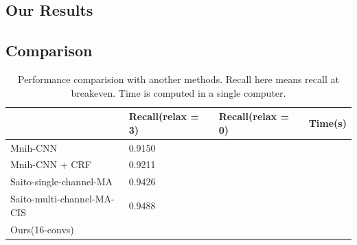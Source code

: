\documentclass[runningheads]{llncs}
\begin{document}
\subsection{Our Results}
   
   
\subsection{Comparison}   
   
    \begin{table} \label{tab:PerformanceComparision}
    \centering
	\caption{Performance comparision with another methods. Recall here  means recall at breakeven. Time is computed in a single computer.}
	\begin{tabular}{L{4.1cm}C{2.6cm}C{2.6cm}C{2.2cm}}    %
	\toprule
	& Recall(relax = 3) & Recall(relax = 0)& Time(s)\\
	\midrule
	Mnih-CNN & 0.9150 &  & \\
	Mnih-CNN + CRF & 0.9211&  & \\
	Saito-single-channel-MA & 0.9426 & & \\
	Saito-multi-channel-MA-CIS & 0.9488 & & \\
	Ours(16-convs) & $\bm{}$ & $\bm{}$ & $\bm{}$\\
	\bottomrule
	\end{tabular}
	\end{table}
 
\end{document}
